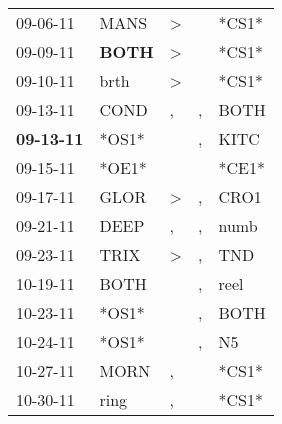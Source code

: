 \begin{supertabular}{p{0.07\textwidth}p{0.06\textwidth}p{0.02\textwidth}p{0.02\textwidth}p{0.06\textwidth}}
          09-06-11\textsuperscript{} &           MANS\textsuperscript{} &     \textgreater &                  &                            *CS1* \\
          09-09-11\textsuperscript{} &  \textbf{BOTH\textsuperscript{}} &     \textgreater &                  &                            *CS1* \\
          09-10-11\textsuperscript{} &           brth\textsuperscript{} &     \textgreater &                  &                            *CS1* \\
          09-13-11\textsuperscript{} &           COND\textsuperscript{} &                , &                , &           BOTH\textsuperscript{} \\
 \textbf{09-13-11\textsuperscript{}} &                            *OS1* &                  &                , &           KITC\textsuperscript{} \\
          09-15-11\textsuperscript{} &                            *OE1* &                  &                  &                            *CE1* \\
          09-17-11\textsuperscript{} &           GLOR\textsuperscript{} &     \textgreater &                , &           CRO1\textsuperscript{} \\
          09-21-11\textsuperscript{} &           DEEP\textsuperscript{} &                , &                , &           numb\textsuperscript{} \\
          09-23-11\textsuperscript{} &           TRIX\textsuperscript{} &     \textgreater &                , &            TND\textsuperscript{} \\
          10-19-11\textsuperscript{} &           BOTH\textsuperscript{} &                  &                , &           reel\textsuperscript{} \\
          10-23-11\textsuperscript{} &                            *OS1* &                  &                , &           BOTH\textsuperscript{} \\
          10-24-11\textsuperscript{} &                            *OS1* &                  &                , &             N5\textsuperscript{} \\
          10-27-11\textsuperscript{} &           MORN\textsuperscript{} &                , &                  &                            *CS1* \\
          10-30-11\textsuperscript{} &           ring\textsuperscript{} &                , &                  &                            *CS1* \\

\end{supertabular}
